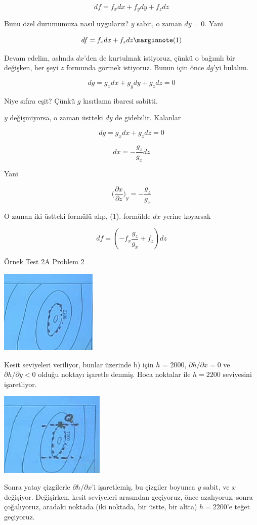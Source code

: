 \documentclass[12pt,fleqn]{article}\usepackage{../../common}
\begin{document}
$$ df = f_xdx + f_ydy + f_zdz $$  

Bunu özel durumumuza nasıl uygularız? $y$ sabit, o zaman $dy = 0$. Yani

$$
df = f_xdx + f_zdz  
\mlabel{1}
$$

Devam edelim, aslında $dx$'den de kurtulmak istiyoruz, çünkü o bağımlı bir
değişken, her şeyi $z$ formunda görmek istiyoruz. Bunun için önce $dg$'yi
bulalım. 

$$ dg = g_xdx + g_ydy + g_zdz = 0   $$

Niye sıfıra eşit? Çünkü $g$ kısıtlama ibaresi sabitti. 

$y$ değişmiyorsa, o zaman üstteki $dy$ de gidebilir. Kalanlar

$$ dg = g_xdx + g_zdz = 0  $$

$$ dx = -\frac{g_z}{g_x}dz $$

Yani 

$$ 
\bigg( \frac{\partial x}{\partial z}\bigg)_{y} = -\frac{g_z}{g_x}
$$

O zaman iki üstteki formülü alıp, (1). formülde $dx$ yerine 
koyarsak

$$ df = (-f_x\frac{g_z}{g_x} +  f_z) dz $$

Örnek Test 2A Problem 2

\includegraphics[height=4cm]{15_2.png}

Kesit seviyeleri veriliyor, bunlar üzerinde b) için $h$ = 2000, $\partial
h/\partial x = 0$ ve $\partial h/\partial y < 0$ olduğu noktayı işaretle
denmiş. Hoca noktalar ile $h=2200$ seviyesini işaretliyor.

\includegraphics[height=4cm]{15_3.png}

Sonra yatay çizgilerle $\partial h/\partial x$'i işaretlemiş, bu çizgiler
boyunca $y$ sabit, ve $x$ değişiyor. Değişirken, kesit seviyeleri arasından
geçiyoruz, önce azalıyoruz, sonra çoğalıyoruz, aradaki noktada (iki
noktada, bir üstte, bir altta) $h=2200$'e teğet geçiyoruz. 
\end{document}
